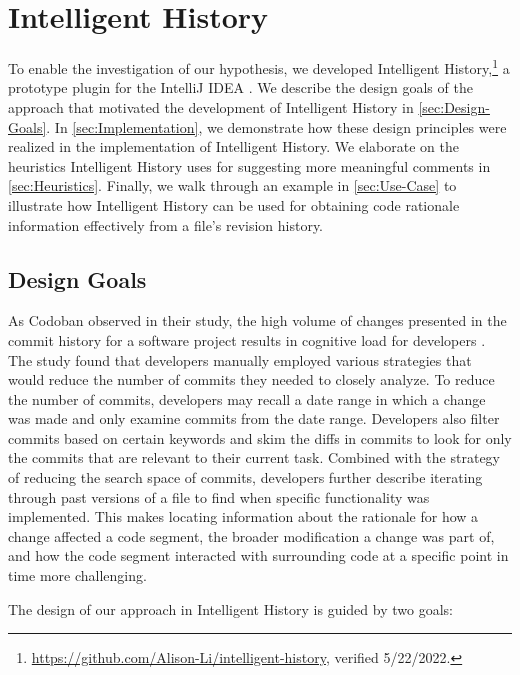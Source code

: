 \chapter{Intelligent History}
\label{ch:Intelligent-History}

To enable the investigation of our hypothesis, we developed Intelligent History,\footnote{\url{https://github.com/Alison-Li/intelligent-history}, verified 5/22/2022.} 
a prototype plugin for the IntelliJ IDEA .
We describe the design goals of the approach that motivated the development of Intelligent History in \autoref{sec:Design-Goals}. 
In \autoref{sec:Implementation}, we demonstrate how these design principles were realized in the implementation of Intelligent History. 
We elaborate on the heuristics Intelligent History uses for suggesting more meaningful comments in \autoref{sec:Heuristics}.
Finally, we walk through an example in \autoref{sec:Use-Case} to illustrate how Intelligent History can be used for obtaining code rationale information effectively from a file's revision history.

\section{Design Goals}
\label{sec:Design-Goals}

As Codoban \etal observed in their study, the high volume of changes presented in the commit history for a software project results in cognitive load for developers \cite{codoban_software_2015}.
The study found that developers manually employed various strategies that would reduce the number of commits they needed to closely analyze.
To reduce the number of commits, developers may recall a date range in which a change was made and only examine commits from the date range.
Developers also filter commits based on certain keywords and skim the diffs in commits to look for only the commits that are relevant to their current task.
Combined with the strategy of reducing the search space of commits, developers further describe iterating through past versions of a file to find when specific functionality was implemented.
This makes locating information about the rationale for how a change affected a code segment, 
the broader modification a change was part of, 
and how the code segment interacted with surrounding code at a specific point in time more challenging.

The design of our approach in Intelligent History is guided by two goals: 

